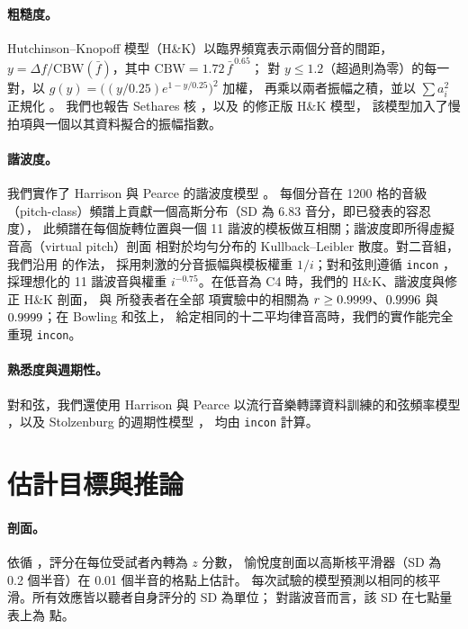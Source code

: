 \documentclass[11pt,a4paper]{article}
\newcommand{\HK}{H\&K}
\begin{document}
\paragraph{粗糙度。}
Hutchinson--Knopoff 模型（\HK）以臨界頻寬表示兩個分音的間距，
$y=\Delta f/\mathrm{CBW}(\bar f)$，其中 $\mathrm{CBW}=1.72\,\bar f^{\,0.65}$；
對 $y\le1.2$（超過則為零）的每一對，以 $g(y)=\bigl((y/0.25)e^{1-y/0.25}\bigr)^2$ 加權，
再乘以兩者振幅之積，並以 $\sum a_i^2$ 正規化 \citep{hutchinson1978}。
我們也報告 Sethares 核 \citep{sethares1993}，以及 \citet{marjieh2024} 的修正版 \HK{} 模型，
該模型加入了慢拍項與一個以其資料擬合的振幅指數。

\paragraph{諧波度。}
我們實作了 Harrison 與 Pearce 的諧波度模型 \citep{harrison2018,harrison2020}。
每個分音在 1200 格的音級（pitch-class）頻譜上貢獻一個高斯分布（SD 為 6.83 音分，即已發表的容忍度），
此頻譜在每個旋轉位置與一個 11 諧波的模板做互相關；諧波度即所得虛擬音高（virtual pitch）剖面
相對於均勻分布的 Kullback--Leibler 散度。對二音組，我們沿用 \citet{marjieh2024} 的作法，
採用刺激的分音振幅與模板權重 $1/i$；對和弦則遵循 \texttt{incon} \citep{incon}，
採理想化的 11 諧波音與權重 $i^{-0.75}$。在低音為 C4 時，我們的 \HK、諧波度與修正 \HK{} 剖面，
與 \citet{marjieh2024} 所發表者在全部 \nValExp{} 項實驗中的相關為
$r\ge0.9999$、$0.9996$ 與 $0.9999$；在 Bowling 和弦上，
給定相同的十二平均律音高時，我們的實作能完全重現 \texttt{incon}。

\paragraph{熟悉度與週期性。}
對和弦，我們還使用 Harrison 與 Pearce 以流行音樂轉譯資料訓練的和弦頻率模型
\citep{burgoyne2011}，以及 Stolzenburg 的週期性模型 \citep{stolzenburg2015}，
均由 \texttt{incon} 計算。

\section{估計目標與推論}
\label{sec:estimands}

\paragraph{剖面。}
依循 \citet{marjieh2024}，評分在每位受試者內轉為 $z$ 分數，
愉悅度剖面以高斯核平滑器（SD 為 0.2 個半音）在 0.01 個半音的格點上估計。
每次試驗的模型預測以相同的核平滑。所有效應皆以聽者自身評分的 SD 為單位；
對諧波音而言，該 SD 在七點量表上為 \rawSDharm{} 點。
\end{document}

